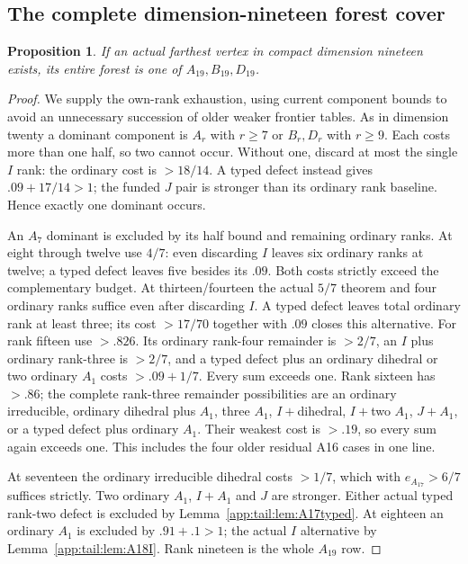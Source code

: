 \documentclass[11pt]{article}
\newtheorem{proposition}[theorem]{Proposition}
\theoremstyle{definition}
\theoremstyle{remark}
\begin{document}
\subsection{The complete dimension-nineteen forest cover}
\begin{proposition}\label{app:tail:prop:exact19cover}
If an actual farthest vertex in compact dimension nineteen exists,
its entire forest is one of $A_{19},B_{19},D_{19}$.
\end{proposition}
\begin{proof}
We supply the own-rank exhaustion, using current component bounds
to avoid an unnecessary succession of older weaker frontier tables.
As in dimension twenty a dominant component is $A_r$ with
$r\ge7$ or $B_r,D_r$ with $r\ge9$.
Each costs more than one half, so two cannot occur. Without
one, discard at most the single $I$ rank: the ordinary cost
is $>18/14$. A typed defect instead gives
$.09+17/14>1$; the funded $J$ pair is stronger than its
ordinary rank baseline. Hence exactly one dominant occurs.

An $A_7$ dominant is excluded by its half bound and remaining
ordinary ranks. At eight through twelve use $4/7$:
even discarding $I$ leaves six ordinary ranks at twelve;
a typed defect leaves five besides its $.09$. Both costs
strictly exceed the complementary budget.
At thirteen/fourteen the actual $5/7$ theorem and four
ordinary ranks suffice even after discarding $I$.
A typed defect leaves total ordinary rank at least three;
its cost $>17/70$ together with $.09$ closes this alternative.
For rank fifteen use $>.826$. Its ordinary rank-four
remainder is $>2/7$, an $I$ plus ordinary rank-three is
$>2/7$, and a typed defect plus an ordinary dihedral or
two ordinary $A_1$ costs $>.09+1/7$.
Every sum exceeds one. Rank sixteen has $>.86$;
the complete rank-three remainder possibilities are an
ordinary irreducible, ordinary dihedral plus $A_1$, three
$A_1$, $I+$dihedral, $I+$two $A_1$, $J+A_1$, or a typed
defect plus ordinary $A_1$.
Their weakest cost is $>.19$, so every sum again exceeds one.
This includes the four older residual A16 cases in one line.

At seventeen the ordinary irreducible dihedral costs $>1/7$,
which with $e_{A_{17}}>6/7$ suffices strictly. Two ordinary
$A_1$, $I+A_1$ and $J$ are stronger. Either actual typed
rank-two defect is excluded by Lemma~\ref{app:tail:lem:A17typed}.
At eighteen an ordinary $A_1$ is excluded by $.91+.1>1$;
the actual $I$ alternative by Lemma~\ref{app:tail:lem:A18I}.
Rank nineteen is the whole $A_{19}$ row.


\end{proof}
\end{document}
